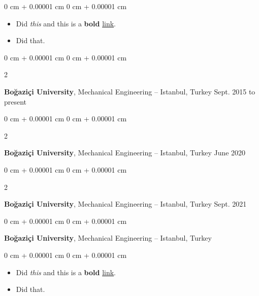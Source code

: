 \documentclass[10pt, letterpaper]{article}
\newenvironment{highlights}{
    \begin{itemize}[
        topsep=0.10 cm,
        parsep=0.10 cm,
        partopsep=0pt,
        itemsep=0pt,
        leftmargin=0 cm + 10pt
    ]
}{
    \end{itemize}
} %
\newenvironment{onecolentry}{
    \begin{adjustwidth}{
        0 cm + 0.00001 cm
    }{
        0 cm + 0.00001 cm
    }
}{
    \end{adjustwidth}
} %
\newenvironment{twocolentry}[2][]{
    \onecolentry
    \def\secondColumn{#2}
    \setcolumnwidth{\fill, 4.5 cm}
    \begin{paracol}{2}
}{
    \switchcolumn \raggedleft \secondColumn
    \end{paracol}
    \endonecolentry
} %
\begin{document}
        \vspace{0.10 cm}
        \begin{onecolentry}
            \begin{highlights}
                \item Did \textit{this} and this is a \textbf{bold} \href{https://example.com}{link}.
                \item Did that.
            \end{highlights}
        \end{onecolentry}


        \vspace{0.2 cm}

        \begin{twocolentry}{
            Sept. 2015 to present
        }
            \textbf{Boğaziçi University}, Mechanical Engineering -- Istanbul, Turkey\end{twocolentry}



        \vspace{0.2 cm}

        \begin{twocolentry}{
            June 2020
        }
            \textbf{Boğaziçi University}, Mechanical Engineering -- Istanbul, Turkey\end{twocolentry}



        \vspace{0.2 cm}

        \begin{twocolentry}{
            Sept. 2021
        }
            \textbf{Boğaziçi University}, Mechanical Engineering -- Istanbul, Turkey\end{twocolentry}



        \vspace{0.2 cm}

        \begin{onecolentry}
            \textbf{Boğaziçi University}, Mechanical Engineering -- Istanbul, Turkey\end{onecolentry}

        \vspace{0.10 cm}
        \begin{onecolentry}
            \begin{highlights}
                \item Did \textit{this} and this is a \textbf{bold} \href{https://example.com}{link}.
                \item Did that.
            \end{highlights}
        \end{onecolentry}
\end{document}
